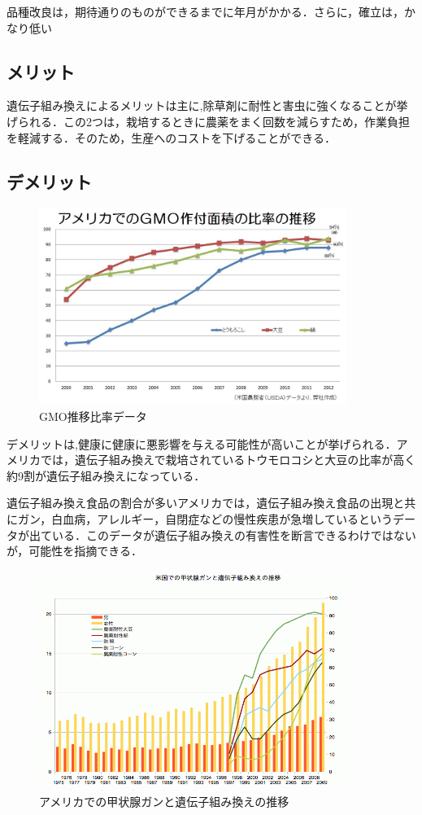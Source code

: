 品種改良は，期待通りのものができるまでに年月がかかる．さらに，確立は，かなり低い\cite{idennsi}

\subsection{メリット}
遺伝子組み換えによるメリットは主に,除草剤に耐性と害虫に強くなることが挙げられる．この2つは，栽培するときに農薬をまく回数を減らすため，作業負担を軽減する．そのため，生産へのコストを下げることができる．
\subsection{デメリット}
\begin{figure}[htb]
\centering
\includegraphics[width=10cm]{GMO.jpg}
\caption{GMO推移比率データ}\label{図}
\end{figure}

デメリットは,健康に健康に悪影響を与える可能性が高いことが挙げられる．アメリカでは，遺伝子組み換えで栽培されているトウモロコシと大豆の比率が高く約9割が遺伝子組み換えになっている．\cite{akikawa}

遺伝子組み換え食品の割合が多いアメリカでは，遺伝子組み換え食品の出現と共にガン，白血病，アレルギー，自閉症などの慢性疾患が急増しているというデータが出ている．このデータが遺伝子組み換えの有害性を断言できるわけではないが，可能性を指摘できる．\cite{mondsi}
\begin{figure}[htb]
\centering
\includegraphics[width=10cm]{gan.png}
\caption{アメリカでの甲状腺ガンと遺伝子組み換えの推移}\label{図}
\end{figure}


